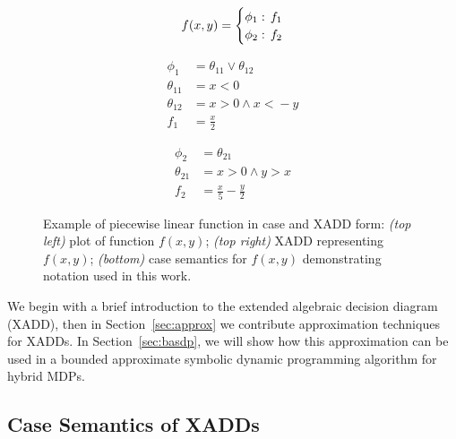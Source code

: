 \begin{figure}[t!]
\begin{minipage}{0.16\textwidth}
{\scriptsize
\begin{align*}
f(x,y)= 
\begin{cases}
  \phi_1:& \hspace{-2mm} f_1\\ 
  \phi_2: & \hspace{-2mm}f_2\\ 
\end{cases}
\end{align*} }
\end{minipage}
\begin{minipage}{0.16\textwidth}
{\scriptsize
\begin{align*}
 \phi_1 & = \theta_{11}\vee \theta_{12}\\
\theta_{11} & = x\!<\!0 \\
\theta_{12} & = x\!>\!0 \wedge x\!<\!-y \\
 f_1 & = \displaystyle \frac{x}{2} 
\end{align*} }
\end{minipage}
\begin{minipage}{0.15\textwidth}
{\scriptsize
\begin{align*}
\phi_2 & = \theta_{21}\\
\theta_{21} & = x\!>\!0 \wedge y\!>\!x\\
f_2 & = \displaystyle \frac{x}{5} - \frac{y}{2}
\end{align*} }
\end{minipage}
\vspace{-6mm}

\caption{\footnotesize Example of piecewise linear function in case and XADD form: \emph{(top left)} plot of function $f(x,y)$; \emph{(top right)} XADD representing $f(x,y)$; \emph{(bottom)} case semantics for $f(x,y)$ demonstrating notation used in this work.}
\label{fig:symbex}
\end{figure}

\label{sec:xadd}

We begin with a brief introduction to the extended algebraic decision
diagram (XADD), then in Section~\ref{sec:approx} we contribute
approximation techniques for XADDs.  In Section~\ref{sec:basdp}, we
will show how this approximation can be used in a bounded
approximate symbolic dynamic programming algorithm for hybrid MDPs.

\subsection{Case Semantics of XADDs}

